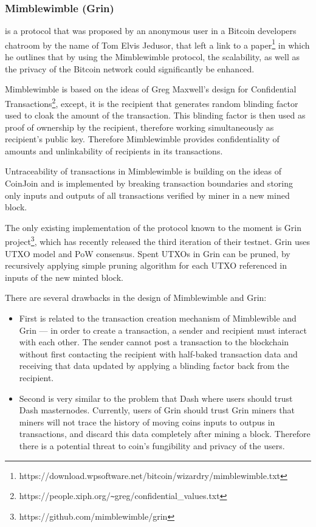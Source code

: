 \documentclass[a4paper, 10pt, conference]{ieeeconf}
\begin{document}
\subsubsection{Mimblewimble (Grin)}

is a protocol that was proposed by an anonymous user in a Bitcoin developers chatroom by the name of Tom Elvis Jedusor, that left a link to a paper\footnote{https://download.wpsoftware.net/bitcoin/wizardry/mimblewimble.txt} in which he outlines that by using the Mimblewimble protocol, the scalability, as well as the privacy of the Bitcoin network could significantly be enhanced.

Mimblewimble is based on the ideas of Greg Maxwell's design for Confidential Transactions\footnote{https://people.xiph.org/\texttt{\~{}}greg/confidential\_values.txt},  except, it is the recipient that generates random blinding factor used to cloak the amount of the transaction. This blinding factor is then used as proof of ownership by the recipient, therefore working simultaneously as recipient's public key. Therefore Mimblewimble provides confidentiality of amounts and unlinkability of recipients in its transactions.

Untraceability of transactions in Mimblewimble is building on the ideas of CoinJoin and is implemented by breaking transaction boundaries and storing only inputs and outputs of all transactions verified by miner in a new mined block.

The only existing implementation of the protocol known to the moment is Grin project\footnote{https://github.com/mimblewimble/grin}, which has recently released the third iteration of their testnet. Grin uses UTXO model and PoW consensus. Spent UTXOs in Grin can be pruned, by recursively applying simple pruning algorithm for each UTXO referenced in inputs of the new minted block.

There are several drawbacks in the design of Mimblewimble and Grin:

\begin{itemize}

\item{First is related to the transaction creation mechanism of Mimblewible and Grin --- in order to create a transaction, a sender and recipient must interact with each other. The sender cannot post a transaction to the blockchain without first contacting the recipient with half-baked transaction data and receiving that data updated by applying a blinding factor back from the recipient.}
\item{Second is very similar to the problem that Dash where users should trust Dash masternodes. Currently, users of Grin should trust Grin miners that miners will not trace the history of moving coins inputs to outpus in transactions, and discard this data completely after mining a block. Therefore there is a potential threat to coin's fungibility and privacy of the users.}

\end{itemize}
\end{document}

